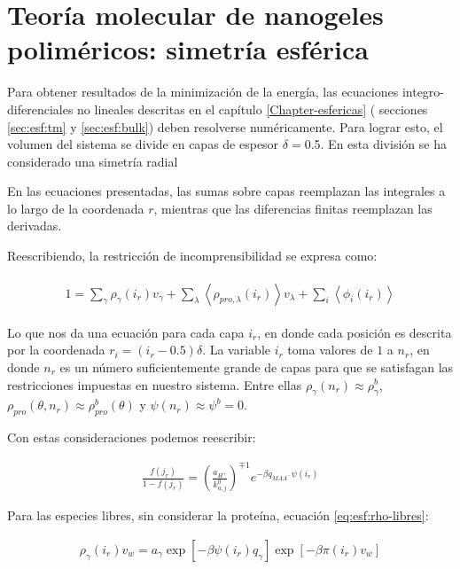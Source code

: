\section{Teor\'ia molecular de nanogeles polim\'ericos: simetr\'ia esf\'erica}


Para obtener resultados de la minimizaci\'on de la energ\'ia, las ecuaciones integro-diferenciales no lineales descritas en el cap\'itulo \ref{Chapter-esfericas} ( secciones \ref{sec:esf:tm} y \ref{sec:esf:bulk}) deben resolverse num\'ericamente. Para lograr esto, el volumen del sistema se divide en capas de espesor $\delta = $0.5. En esta divisi\'on se ha considerado una simetr\'ia radial 

En las ecuaciones presentadas, las sumas sobre capas reemplazan las integrales a lo largo de la coordenada $r$, mientras que las diferencias finitas reemplazan las derivadas.

Reescribiendo, la restricci\'on de incomprensibilidad se expresa como:

\begin{align}
	\begin{aligned}
		1=  {\sum_{\gamma}\rho_\gamma(i_r) v_\gamma + \sum_\lambda{\left<\rho_{pro,\lambda}(i_r)\right>v_\lambda} + \sum_i{\left<\phi_i(i_r)\right>}}
		\label{eq:esf:pi-ir}
	\end{aligned}
\end{align}

Lo que nos da una ecuaci\'on para cada capa $i_r$, en donde cada posici\'on es descrita por la coordenada $r_i = (i_r -0.5)\delta$. 
La variable $i_r$ toma valores de $1$ a $n_r$, en donde $n_r$ es un n\'umero suficientemente grande de capas para que se satisfagan las restricciones impuestas en nuestro sistema. Entre ellas
$\rho_\gamma(n_r) \approx \rho_\gamma^b$, $\rho_{pro}(\theta,n_r) \approx \rho_{pro}^b(\theta)$ y $\psi(n_r) \approx \psi^b = 0$.

Con estas consideraciones podemos reescribir:


\begin{align}
	\frac{f(j_r)}{1-f(j_r)}= \left(\frac{a_{H^+}}{k^0_{a,j}}\right)^{\mp 1} e^{-\beta q_{MAA^-}\psi(i_r)}
\end{align}


Para las especies libres, sin considerar la prote\'ina, ecuaci\'on \ref{eq:esf:rho-libres}:

\begin{align}
	\rho_\gamma(i_r)v_w = a_\gamma \exp{[-\beta \psi(i_r)q_\gamma]} \exp{[-\beta\pi(i_r) v_w]}
\end{align}

